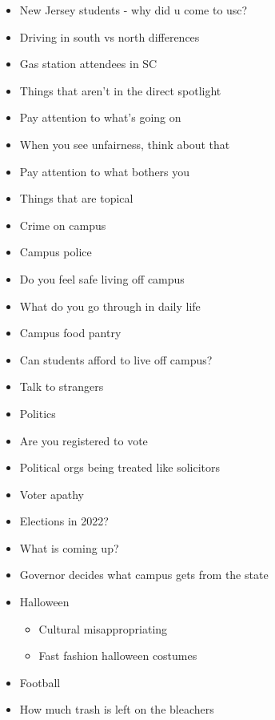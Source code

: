 \documentclass{article}
\begin{document}
\begin{itemize}
\item
  New Jersey students - why did u come to usc?
\item
  Driving in south vs north differences
\item
  Gas station attendees in SC
\end{itemize}

\begin{itemize}
\item
  Things that aren't in the direct spotlight~
\item
  Pay attention to what's going on
\item
  When you see unfairness, think about that~
\item
  Pay attention to what bothers you
\item
  Things that are topical
\item
  Crime on campus
\item
  Campus police
\item
  Do you feel safe living off campus
\item
  What do you go through in daily life
\item
  Campus food pantry
\item
  Can students afford to live off campus?
\item
  Talk to strangers~
\item
  Politics~
\item
  Are you registered to vote
\item
  Political orgs being treated like solicitors
\item
  Voter apathy~
\item
  Elections in 2022?
\item
  What is coming up?
\item
  Governor decides what campus gets from the state
\item
  Halloween

  \begin{itemize}
  \item
    Cultural misappropriating~
  \item
    Fast fashion halloween costumes~
  \end{itemize}
\item
  Football~
\item
  How much trash is left on the bleachers


\end{itemize}
\end{document}
